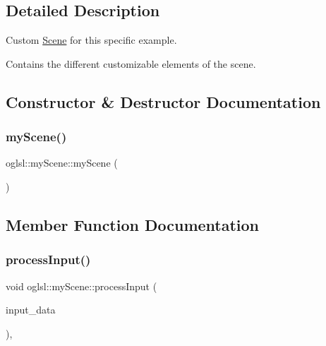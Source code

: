 \subsection{Detailed Description}
Custom \mbox{\hyperlink{classoglsl_1_1_scene}{Scene}} for this specific example. 

Contains the different customizable elements of the scene. 

\subsection{Constructor \& Destructor Documentation}
\mbox{\label{classoglsl_1_1my_scene_a1ea16fb5ced9ac6f5fea4db7688d6076}} 
\subsubsection{\texorpdfstring{my\+Scene()}{myScene()}}
{\footnotesize\ttfamily oglsl\+::my\+Scene\+::my\+Scene (\begin{DoxyParamCaption}{ }\end{DoxyParamCaption})}



\subsection{Member Function Documentation}
\mbox{\label{classoglsl_1_1my_scene_aeab1e8cfe8c40f6110e1789a74008191}} 
\subsubsection{\texorpdfstring{process\+Input()}{processInput()}}
{\footnotesize\ttfamily void oglsl\+::my\+Scene\+::process\+Input (\begin{DoxyParamCaption}\item[{\mbox{\hyperlink{classoglsl_1_1_input_a3b21d7328538e661f366af5d6059c197}{Input\+::\+Input\+Data}}}]{input\+\_\+data }\end{DoxyParamCaption})\hspace{0.3cm}{\ttfamily [override]}, {\ttfamily [virtual]}}



